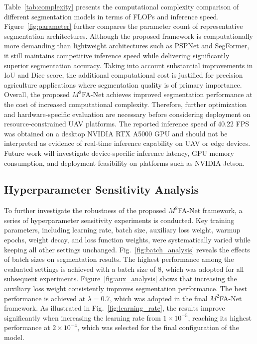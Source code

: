 \documentclass[pdflatex,sn-mathphys-num]{sn-jnl}
\newcommand{\rev}[1]{{\color{revisionblue}#1}}
\begin{document}
Table~\ref{tab:complexity} presents the computational complexity comparison of different segmentation models in terms of FLOPs and inference speed. Figure~\ref{fig:parameter} further compares the parameter count of representative segmentation architectures. Although the proposed framework is computationally more demanding than lightweight architectures such as PSPNet and SegFormer, it still maintains competitive inference speed while delivering significantly superior segmentation accuracy. Taking into account substantial improvements in IoU and Dice score, the additional computational cost is justified for precision agriculture applications where segmentation quality is of primary importance. Overall, the proposed $M^2$FA-Net achieves improved segmentation performance at the cost of increased computational complexity. Therefore, further optimization and hardware-specific evaluation are necessary before considering deployment on resource-constrained UAV platforms.
\rev{
The reported inference speed of 40.22 FPS was obtained on a desktop NVIDIA RTX A5000 GPU and should not be interpreted as evidence of real-time inference capability on UAV or edge devices. Future work will investigate device-specific inference latency, GPU memory consumption, and deployment feasibility on platforms such as NVIDIA Jetson.
}



\subsection{Hyperparameter Sensitivity Analysis}
To further investigate the robustness of the proposed $M^2$FA-Net framework, a series of hyperparameter sensitivity experiments is conducted. Key training parameters, including learning rate, batch size, auxiliary loss weight, warmup epochs, weight decay, and loss function weights, were systematically varied while keeping all other settings unchanged. 
Fig.~\ref{fig:batch_analysis} reveals the effects of batch sizes on segmentation results. The highest performance among the evaluated settings is achieved with a batch size of 8, which was adopted for all subsequent experiments.
Figure~\ref{fig:aux_analysis} shows that increasing the auxiliary loss weight consistently improves segmentation performance. The best performance is achieved at $\lambda=0.7$, which was adopted in the final $M^2$FA-Net framework.
As illustrated in Fig.~\ref{fig:learning_rate}, the results improve significantly when increasing the learning rate from $1\times10^{-5}$, reaching its highest performance at $2\times10^{-4}$, which was selected for the final configuration of the model.
\end{document}

